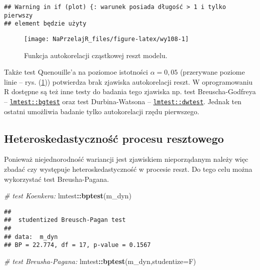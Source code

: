 \documentclass[polish,]{book}
\newenvironment{Shaded}{\begin{snugshade}}{\end{snugshade}}
\newcommand{\CommentTok}[1]{\textcolor[rgb]{0.56,0.35,0.01}{\textit{#1}}}
\newcommand{\DataTypeTok}[1]{\textcolor[rgb]{0.13,0.29,0.53}{#1}}
\newcommand{\KeywordTok}[1]{\textcolor[rgb]{0.13,0.29,0.53}{\textbf{#1}}}
\newcommand{\NormalTok}[1]{#1}
\newcommand{\OperatorTok}[1]{\textcolor[rgb]{0.81,0.36,0.00}{\textbf{#1}}}
\begin{document}
\begin{verbatim}
## Warning in if (plot) {: warunek posiada długość > 1 i tylko pierwszy
## element będzie użyty
\end{verbatim}

\begin{figure}[h]

{\centering \texttt{[image: NaPrzelajR\_files/figure-latex/wy108-1]} 

}

\caption{Funkcja autokorelacji cząstkowej reszt modelu.}\label{fig:wy108}
\end{figure}

Także test Quenouille'a na poziomoe istotności \(\alpha = 0,05\) (przerywane poziome
linie -- rys. (\ref{fig:wy108})) potwierdza brak zjawiska autokorelacji reszt. W oprogramowaniu R dostępne są też inne testy do badania tego zjawiska np. test Breuscha-Godfreya -- \href{https://rdrr.io/cran/lmtest/man/bgtest.html}{\texttt{lmtest::bgtest}}
oraz test Durbina-Watsona -- \href{https://rdrr.io/cran/lmtest/man/dwtest.html}{\texttt{lmtest::dwtest}}. Jednak
ten ostatni umożliwia badanie tylko autokorelacji rzędu pierwszego.

\hypertarget{part_10.4.3}{%
\subsection{Heteroskedastyczność procesu resztowego}\label{part_10.4.3}}

Ponieważ niejednorodność wariancji jest zjawiskiem nieporządanym należy więc zbadać czy występuje heteroskedastyczność w procesie reszt. Do tego celu można wykorzystać test Breusha-Pagana.

\begin{Shaded}
\begin{Highlighting}[]
\CommentTok{# test Koenkera:}
\NormalTok{lmtest}\OperatorTok{::}\KeywordTok{bptest}\NormalTok{(m_dyn)}
\end{Highlighting}
\end{Shaded}

\begin{verbatim}
## 
##  studentized Breusch-Pagan test
## 
## data:  m_dyn
## BP = 22.774, df = 17, p-value = 0.1567
\end{verbatim}

\begin{Shaded}
\begin{Highlighting}[]
\CommentTok{# test Breusha-Pagana:}
\NormalTok{lmtest}\OperatorTok{::}\KeywordTok{bptest}\NormalTok{(m_dyn,}\DataTypeTok{studentize=}\NormalTok{F)}
\end{Highlighting}
\end{Shaded}
\end{document}
